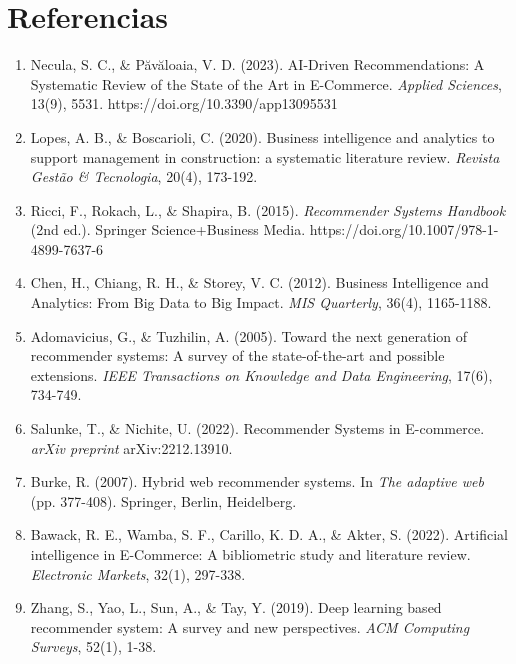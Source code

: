 \documentclass[twocolumn]{article}
\begin{document}
\section{Referencias}

\begin{enumerate}
    \item Necula, S. C., \& Păvăloaia, V. D. (2023). AI-Driven Recommendations: A Systematic Review of the State of the Art in E-Commerce. \textit{Applied Sciences}, 13(9), 5531. https://doi.org/10.3390/app13095531

    \item Lopes, A. B., \& Boscarioli, C. (2020). Business intelligence and analytics to support management in construction: a systematic literature review. \textit{Revista Gestão \& Tecnologia}, 20(4), 173-192.

    \item Ricci, F., Rokach, L., \& Shapira, B. (2015). \textit{Recommender Systems Handbook} (2nd ed.). Springer Science+Business Media. https://doi.org/10.1007/978-1-4899-7637-6

    \item Chen, H., Chiang, R. H., \& Storey, V. C. (2012). Business Intelligence and Analytics: From Big Data to Big Impact. \textit{MIS Quarterly}, 36(4), 1165-1188.

    \item Adomavicius, G., \& Tuzhilin, A. (2005). Toward the next generation of recommender systems: A survey of the state-of-the-art and possible extensions. \textit{IEEE Transactions on Knowledge and Data Engineering}, 17(6), 734-749.

    \item Salunke, T., \& Nichite, U. (2022). Recommender Systems in E-commerce. \textit{arXiv preprint} arXiv:2212.13910.

    \item Burke, R. (2007). Hybrid web recommender systems. In \textit{The adaptive web} (pp. 377-408). Springer, Berlin, Heidelberg.

    \item Bawack, R. E., Wamba, S. F., Carillo, K. D. A., \& Akter, S. (2022). Artificial intelligence in E-Commerce: A bibliometric study and literature review. \textit{Electronic Markets}, 32(1), 297-338.

    \item Zhang, S., Yao, L., Sun, A., \& Tay, Y. (2019). Deep learning based recommender system: A survey and new perspectives. \textit{ACM Computing Surveys}, 52(1), 1-38.


\end{enumerate}
\end{document}
